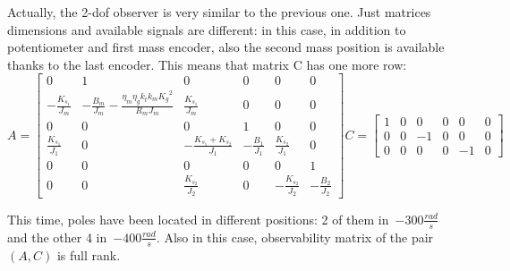 Actually, the 2-dof observer is very similar to the previous one. Just matrices dimensions and available signals are different: in this case, in addition to potentiometer and first mass encoder, also the second mass position is available thanks to the last encoder. This means that matrix C has one more row:
\begin{equation}
	A = 
	\begin{bmatrix}
		0 &1 & 0 & 0 & 0 & 0 \\
		-\frac{K_{s_1}}{J_m} & -\frac{B_m}{J_m}-\frac{\eta_m \eta_g k_t k_m {K_g}^2}{R_m J_m}  & \frac{K_{s_1}}{J_m} & 0 & 0 & 0 \\
		0 & 0 & 0 & 1 & 0 & 0 \\
		\frac{K_{s_1}}{J_1} & 0 & -\frac{K_{s_1}+K_{s_2}}{J_1} & -\frac{B_1}{J_1} & \frac{K_{s_2}}{J_1} & 0 \\
		0 & 0 & 0 & 0 & 0 & 1 \\
		0 & 0 & \frac{K_{s_2}}{J_2} & 0 & -\frac{K_{s_2}}{J_2} & -\frac{B_2}{J_2}
	\end{bmatrix}
	C =
	\begin{bmatrix}
		1 & 0 & 0 & 0 & 0 & 0 \\
		0 & 0 & -1 & 0 & 0 & 0  \\
		0 & 0 & 0 & 0 & -1 & 0
	\end{bmatrix}
\end{equation}

This time, poles have been located in different positions: 2 of them in~$-300\frac{rad}{s}$ and the other 4 in~$-400\frac{rad}{s}$. Also in this case, observability matrix of the pair~$(A,C)$ is full rank.
